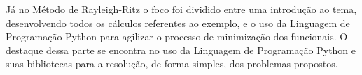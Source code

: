 \documentclass[
	12pt,				%
	openright,			%
    twoside,			%
	a4paper,			%
	english,			%
	french,				%
	spanish,			%
	brazil				%
	]{abntex2}
\numberwithin{lema}{chapter}
\numberwithin{teorema}{chapter}
\numberwithin{definicao}{chapter}
\numberwithin{exemplo}{chapter}
\numberwithin{figure}{chapter}
\begin{document}
Já no Método de Rayleigh-Ritz o foco foi dividido entre uma introdução ao tema, desenvolvendo todos os cálculos referentes ao exemplo, e o uso da Linguagem de Programação Python para agilizar o processo de minimização dos funcionais. O destaque dessa parte se encontra no uso da Linguagem de Programação Python e suas bibliotecas para a resolução, de forma simples, dos problemas propostos.

\postextual



%
%

\end{document}
